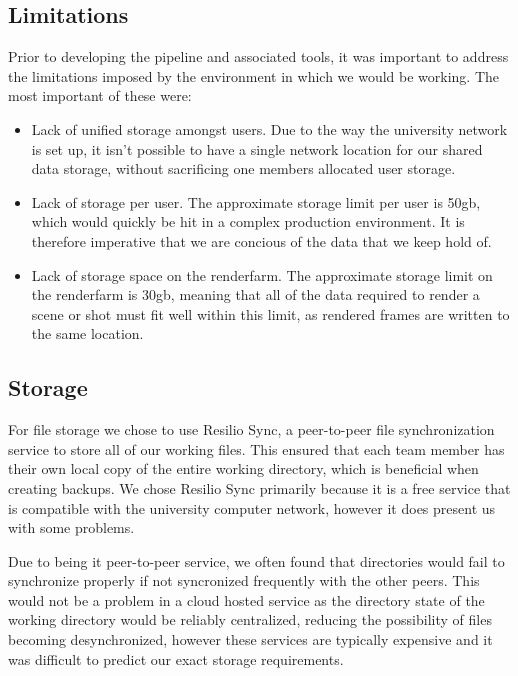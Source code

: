 \documentclass[11pt]{article}
\begin{document}
\subsection{Limitations}

Prior to developing the pipeline and associated tools, it was important to address the limitations imposed by the environment in which we would be working. The most important of these were:

\begin{itemize}

\item Lack of unified storage amongst users. Due to the way the university network is set up, it isn't possible to have a single network location for our shared data storage, without sacrificing one members allocated user storage.

\item Lack of storage per user. The approximate storage limit per user is 50gb, which would quickly be hit in a complex production environment. It is therefore imperative that we are concious of the data that we keep hold of.

\item Lack of storage space on the renderfarm. The approximate storage limit on the renderfarm is 30gb, meaning that all of the data required to render a scene or shot must fit well within this limit, as rendered frames are written to the same location.

\end{itemize}

\subsection{Storage}

For file storage we chose to use Resilio Sync, a peer-to-peer file synchronization service
to store all of our working files. This ensured that each team member has their own local copy of the entire working directory, which is beneficial when creating backups. We chose Resilio Sync primarily because it is a free service that is compatible with the university computer network, however it does present us with some problems.

Due to being it peer-to-peer service, we often found that directories would fail to synchronize properly if not syncronized frequently with the other peers. This would not be a problem in a cloud hosted service as the directory state of the working directory would be reliably centralized, reducing the possibility of files becoming desynchronized, however these services are typically expensive and it was difficult to predict our exact storage requirements.
\end{document}
